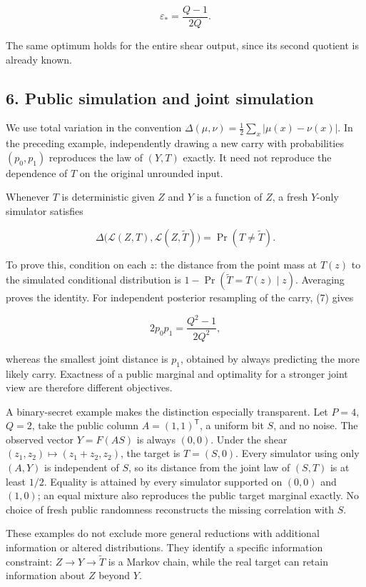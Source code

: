 \documentclass[
]{article}
\begin{document}
\[
\varepsilon_* =\frac{Q-1}{2Q}.
\tag{6}
\]

The same optimum holds for the entire shear output, since its second
quotient is already known.

\subsection{6. Public simulation and joint
simulation}\label{public-simulation-and-joint-simulation}

We use total variation in the convention
\(\Delta(\mu,\nu)=\tfrac12\sum_x|\mu(x)-\nu(x)|\). In the preceding
example, independently drawing a new carry with probabilities
\((p_0,p_1)\) reproduces the law of \((Y,T)\) exactly. It need not
reproduce the dependence of \(T\) on the original unrounded input.

Whenever \(T\) is deterministic given \(Z\) and \(Y\) is a function of
\(Z\), a fresh \(Y\)-only simulator satisfies

\[
\Delta\bigl(\mathcal L(Z,T),\mathcal L(Z,\widetilde T)\bigr)
=\Pr(T\ne\widetilde T).
\tag{7}
\]

To prove this, condition on each \(z\): the distance from the point mass
at \(T(z)\) to the simulated conditional distribution is
\(1-\Pr(\widetilde T=T(z)\mid z)\). Averaging proves the identity. For
independent posterior resampling of the carry, (7) gives

\[
2p_0p_1=\frac{Q^2-1}{2Q^2},
\tag{8}
\]

whereas the smallest joint distance is \(p_1\), obtained by always
predicting the more likely carry. Exactness of a public marginal and
optimality for a stronger joint view are therefore different objectives.

A binary-secret example makes the distinction especially transparent.
Let \(P=4\), \(Q=2\), take the public column \(A=(1,1)^\mathsf{T}\), a
uniform bit \(S\), and no noise. The observed vector \(Y=F(AS)\) is
always \((0,0)\). Under the shear \((z_1,z_2)\mapsto(z_1+z_2,z_2)\), the
target is \(T=(S,0)\). Every simulator using only \((A,Y)\) is
independent of \(S\), so its distance from the joint law of \((S,T)\) is
at least \(1/2\). Equality is attained by every simulator supported on
\((0,0)\) and \((1,0)\); an equal mixture also reproduces the public
target marginal exactly. No choice of fresh public randomness
reconstructs the missing correlation with \(S\).

These examples do not exclude more general reductions with additional
information or altered distributions. They identify a specific
information constraint: \(Z\to Y\to\widetilde T\) is a Markov chain,
while the real target can retain information about \(Z\) beyond \(Y\).
\end{document}
